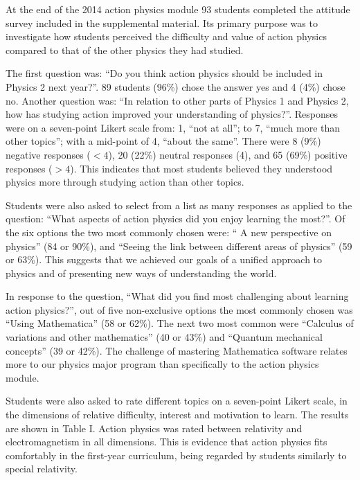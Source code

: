 \documentclass[prb,oncolumn,12pt]{revtex4-2}
\begin{document}
At the end of the 2014 action physics module 93 students completed the attitude survey included in the supplemental material. \cite{supplement} Its primary purpose was to investigate how students perceived the difficulty and value of action physics compared to that of the other physics they had studied. 

The first question was: ``Do you think action physics should be included in Physics 2 next year?''. 89 students (96\%) chose the answer yes and 4 (4\%) chose no. Another question was: ``In relation to other parts of Physics 1 and Physics 2, how has studying action improved your understanding of physics?''. Responses were on a seven-point Likert scale from: 1, ``not at all''; to 7, ``much more than other topics''; with a mid-point of 4, ``about the same''. There were 8 (9\%) negative responses ($<4$), 20 (22\%) neutral responses (4), and 65 (69\%) positive responses ($>4$). This indicates that most students believed they understood physics more through studying action than other topics.

Students were also asked to select from a list as many responses as applied to the question: ``What aspects of action physics did you enjoy learning the most?''. Of the six options the two most commonly chosen were: `` A new perspective on physics'' (84 or 90\%), and ``Seeing the link between different areas of physics'' (59 or 63\%). This suggests that we achieved our goals of a unified approach to physics and of presenting new ways of understanding the world. 

In response to the question, ``What did you find most challenging about learning action physics?'', out of five non-exclusive options the most commonly chosen was ``Using Mathematica'' (58 or 62\%). The next two most common were ``Calculus of variations and other mathematics'' (40 or 43\%) and ``Quantum mechanical concepts'' (39 or 42\%). The challenge of mastering Mathematica software relates more to our physics major program than specifically to the action physics module. \cite{Mathematica}

Students were also asked to rate different topics on a seven-point Likert scale, in the dimensions of relative difficulty, interest and motivation to learn. The results are shown in Table I. Action physics was rated between relativity and electromagnetism in all dimensions. This is evidence that action physics fits comfortably in the first-year curriculum, being regarded by students similarly to special relativity.
\end{document}
